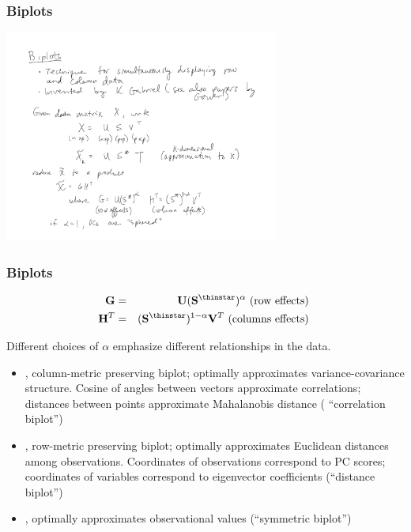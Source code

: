 \documentclass{beamer}
\begin{document}
\begin{frame}
  \frametitle{Biplots}


\begin{center}
\includegraphics[height=2.75in]{about-biplots}
\end{center}

\end{frame}


\begin{frame}
  \frametitle{Biplots}

\begin{eqnarray*}
\Mtx{G} &=& \Mtx{U}(\Mtx{S}^{\thinstar})^{\alpha} \text{ (row effects) } \\
\Mtx{H}^T &=& (\Mtx{S}^{\thinstar})^{1-\alpha} \Mtx{V}^T \text{ (columns effects) }
\end{eqnarray*}

Different choices of $\alpha$ emphasize different relationships in the data.

\begin{itemize}
\item {}, column-metric preserving biplot; optimally approximates variance-covariance structure. Cosine of angles between vectors approximate correlations; distances between points approximate Mahalanobis distance ( ``correlation biplot'')
\item {}, row-metric preserving biplot; optimally approximates Euclidean distances among observations. Coordinates of observations correspond to PC scores; coordinates of variables correspond to eigenvector coefficients (``distance biplot'')
\item {},  optimally approximates observational values (``symmetric biplot'')
\end{itemize}

\end{frame}
\end{document}
